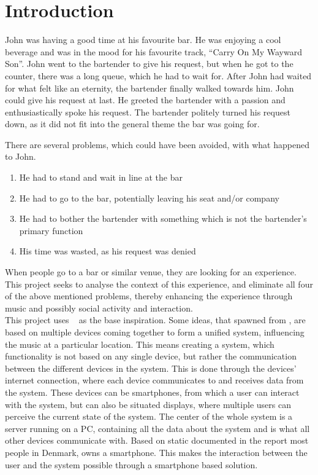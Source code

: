 \chapter{Introduction}\label{introduction}
John was having a good time at his favourite bar. He was enjoying a cool beverage and was in the mood for his favourite track, \enquote{Carry On My Wayward Son}. John went to the bartender to give his request, but when he got to the counter, there was a long queue, which he had to wait for. After John had waited for what felt like an eternity, the bartender finally walked towards him. John could give his request at last. He greeted the bartender with a passion and enthusiastically spoke his request. The bartender politely turned his request down, as it did not fit into the general theme the bar was going for.

There are several problems, which could have been avoided, with what
happened to John.

\begin{enumerate}
	\item He had to stand and wait in line at the bar
	\item He had to go to the bar, potentially leaving his seat and/or
company
	\item He had to bother the bartender with something which is not the bartender's primary function
	\item His time was wasted, as his request was denied
\end{enumerate}

When people go to a bar or similar venue, they are looking for an experience. This project seeks to analyse the context of this experience, and eliminate all four of the above mentioned problems, thereby enhancing the experience through music and possibly social activity and interaction.\\

This project uses ~\cite{sorensen2012} as the base inspiration.
Some ideas, that spawned from , are based on multiple devices coming together to form a unified system, influencing the music at a particular location. This means creating a system, which functionality is not based on any single device, but rather the communication between the different devices in the system.
This is done through the devices’ internet connection, where each device communicates to and receives data from the system. These devices can be smartphones, from which a user can interact with the system, but can also be situated displays, where multiple users can perceive the current state of the system. The center of the whole system is a server running on a PC, containing all the data about the system and is what all other devices communicate with. Based on static documented in the report most people in Denmark, owns a smartphone. This makes the interaction between the user and the system possible through a smartphone based solution.  

